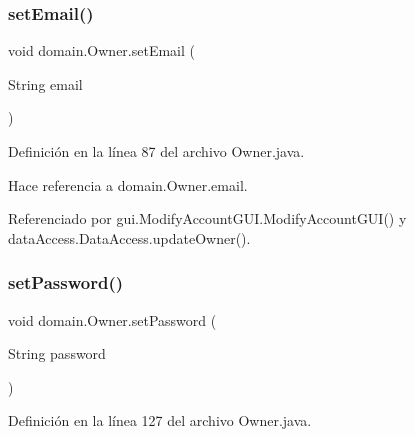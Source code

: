 \subsubsection{\texorpdfstring{setEmail()}{setEmail()}}
{\footnotesize\ttfamily void domain.\+Owner.\+set\+Email (\begin{DoxyParamCaption}\item[{String}]{email }\end{DoxyParamCaption})}



Definición en la línea 87 del archivo Owner.\+java.


\begin{DoxyCode}{0}

\end{DoxyCode}


Hace referencia a domain.\+Owner.\+email.



Referenciado por gui.\+Modify\+Account\+G\+U\+I.\+Modify\+Account\+G\+U\+I() y data\+Access.\+Data\+Access.\+update\+Owner().

\mbox{\label{classdomain_1_1_owner_a9b6bea08f2f6af298a4e7af22fc900dc}} 
\subsubsection{\texorpdfstring{setPassword()}{setPassword()}}
{\footnotesize\ttfamily void domain.\+Owner.\+set\+Password (\begin{DoxyParamCaption}\item[{String}]{password }\end{DoxyParamCaption})}



Definición en la línea 127 del archivo Owner.\+java.


\begin{DoxyCode}{0}

\end{DoxyCode}


